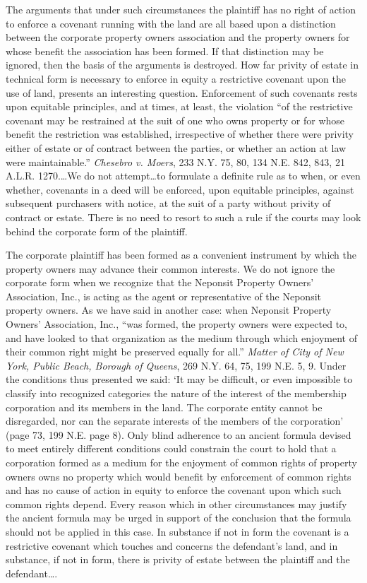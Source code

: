 The arguments that under such circumstances the plaintiff has no right of action
to enforce a covenant running with the land are all based upon a distinction
between the corporate property owners association and the property owners for
whose benefit the association has been formed. If that distinction may be
ignored, then the basis of the arguments is destroyed. How far privity of estate
in technical form is necessary to enforce in equity a restrictive covenant upon
the use of land, presents an interesting question. Enforcement of such covenants
rests upon equitable principles, and at times, at least, the violation ``of the
restrictive covenant may be restrained at the suit of one who owns property or
for whose benefit the restriction was established, irrespective of whether there
were privity either of estate or of contract between the parties, or whether an
action at law were maintainable.'' \emph{Chesebro v. Moers}, 233 N.Y. 75, 80,
134 N.E. 842, 843, 21 A.L.R. 1270.\ldots We do not attempt\ldots to formulate a
definite rule as to when, or even whether, covenants in a deed will be enforced,
upon equitable principles, against subsequent purchasers with notice, at the
suit of a party without privity of contract or estate. There is no need to
resort to such a rule if the courts may look behind the corporate form of the
plaintiff.

The corporate plaintiff has been formed as a convenient instrument by which the
property owners may advance their common interests. We do not ignore the
corporate form when we recognize that the Neponsit Property Owners' Association,
Inc., is acting as the agent or representative of the Neponsit property owners.
As we have said in another case: when Neponsit Property Owners' Association,
Inc., ``was formed, the property owners were expected to, and have looked to
that organization as the medium through which enjoyment of their common right
might be preserved equally for all.'' \emph{Matter of City of New York, Public
Beach, Borough of Queens}, 269 N.Y. 64, 75, 199 N.E. 5, 9. Under the conditions
thus presented we said: `It may be difficult, or even impossible to classify
into recognized categories the nature of the interest of the membership
corporation and its members in the land. The corporate entity cannot be
disregarded, nor can the separate interests of the members of the corporation'
(page 73, 199 N.E. page 8). Only blind adherence to an ancient formula devised
to meet entirely different conditions could constrain the court to hold that a
corporation formed as a medium for the enjoyment of common rights of property
owners owns no property which would benefit by enforcement of common rights and
has no cause of action in equity to enforce the covenant upon which such common
rights depend. Every reason which in other circumstances may justify the ancient
formula may be urged in support of the conclusion that the formula should not be
applied in this case. In substance if not in form the covenant is a restrictive
covenant which touches and concerns the defendant's land, and in substance, if
not in form, there is privity of estate between the plaintiff and the
defendant\ldots .

